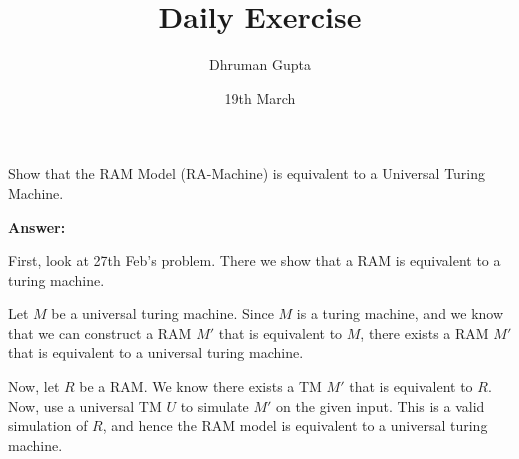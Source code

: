 \documentclass[11pt]{article}
\title{Daily Exercise}
\author{Dhruman Gupta}
\date{19th March}
\begin{document}

Show that the RAM Model (RA-Machine) is equivalent to a Universal Turing Machine.

\textbf{Answer:}

First, look at 27th Feb's problem. There we show that a RAM is equivalent to a turing machine.

Let $M$ be a universal turing machine. Since $M$ is a turing machine, and we know that we can construct a RAM $M'$ that is equivalent to $M$, there exists a RAM $M'$ that is equivalent to a universal turing machine.

Now, let $R$ be a RAM. We know there exists a TM $M'$ that is equivalent to $R$. Now, use a universal TM $U$ to simulate $M'$ on the given input. This is a valid simulation of $R$, and hence the RAM model is equivalent to a universal turing machine.
\end{document}
